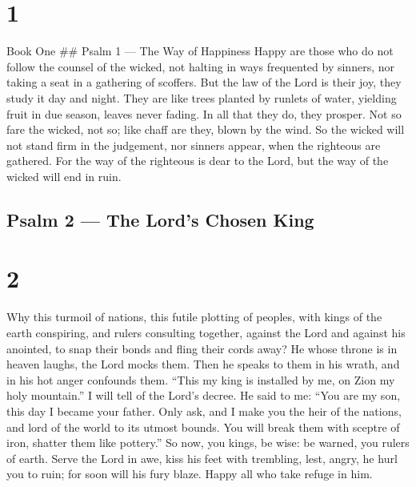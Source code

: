 \hypertarget{section}{%
\section{1}\label{section}}

Book One \#\# Psalm 1 --- The Way of Happiness  Happy are
those who do not follow the counsel of the wicked, not halting in ways
frequented by sinners, nor taking a seat in a gathering of scoffers.
 But the law of the Lord is their joy, they study it day and
night.  They are like trees planted by runlets of water,
yielding fruit in due season, leaves never fading. In all that they do,
they prosper.  Not so fare the wicked, not so; like chaff
are they, blown by the wind.  So the wicked will not stand
firm in the judgement, nor sinners appear, when the righteous are
gathered.  For the way of the righteous is dear to the Lord,
but the way of the wicked will end in ruin.

\hypertarget{psalm-2-the-lords-chosen-king}{%
\subsection{Psalm 2 --- The Lord's Chosen
King}\label{psalm-2-the-lords-chosen-king}}

\hypertarget{section-1}{%
\section{2}\label{section-1}}

 Why this turmoil of nations, this futile plotting of
peoples,  with kings of the earth conspiring, and rulers
consulting together, against the Lord and against his anointed,
 to snap their bonds and fling their cords away?
 He whose throne is in heaven laughs, the Lord mocks them.
 Then he speaks to them in his wrath, and in his hot anger
confounds them.  ``This my king is installed by me, on Zion
my holy mountain.''  I will tell of the Lord's decree. He
said to me: ``You are my son, this day I became your father.
 Only ask, and I make you the heir of the nations, and lord
of the world to its utmost bounds.  You will break them with
sceptre of iron, shatter them like pottery.''  So now, you
kings, be wise: be warned, you rulers of earth.  Serve the
Lord in awe, kiss his feet with trembling,  lest, angry, he
hurl you to ruin; for soon will his fury blaze. Happy all who take
refuge in him.

